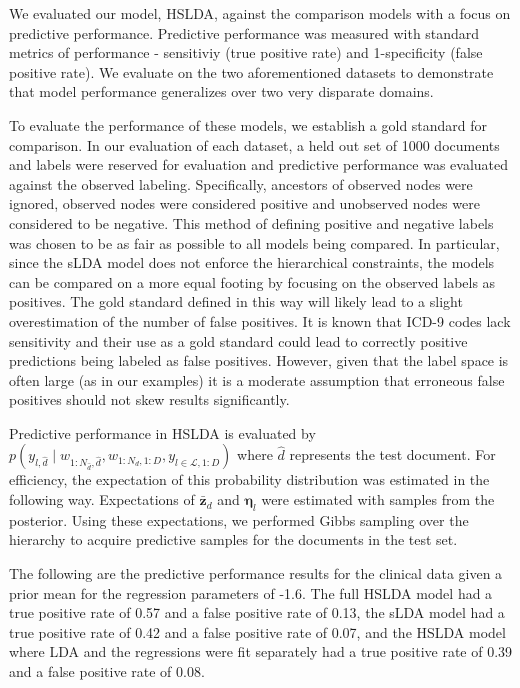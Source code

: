 We evaluated our model, HSLDA, against the comparison models with a focus
on predictive performance. Predictive performance was measured with
standard metrics of performance - sensitiviy (true positive rate) and 
1-specificity (false positive rate). We evaluate on the two aforementioned
datasets to demonstrate that model performance generalizes over two very disparate
domains.

To evaluate the performance of these models, we establish a gold standard for comparison.
In our evaluation of each dataset, a held out set of 1000 documents and labels were
reserved for evaluation and predictive performance was evaluated against the observed
labeling. Specifically, ancestors of observed nodes were ignored, observed nodes 
were considered positive and unobserved nodes were considered to be negative. This method of 
defining positive and negative labels was chosen to be as fair as possible to all models
being compared.  In particular, since the sLDA model does not enforce the hierarchical
constraints, the models can be compared on a more equal footing by focusing on the observed labels
as positives. The gold standard defined in this way will likely lead to a slight overestimation of the number of
false positives. It is known that ICD-9 codes lack sensitivity and their use as a
gold standard could lead to correctly positive predictions being labeled as false positives.
However, given that the label space is often large (as in our examples) it is a moderate assumption that
erroneous false positives should not skew results significantly.

Predictive performance in HSLDA is evaluated by $p\left(y_{l,\hat{d}}\mid w_{1:N_{\hat{d}},\hat{d}}, w_{1:N_d,1:D},  y_{l\in\mathcal{L},1:D}\right)$ where $\hat{d}$ represents the test document. For efficiency,
the expectation of this probability distribution was estimated in the following way. Expectations
of $\mathbf{\bar{z}}_d$ and $\boldsymbol{\eta}_l$ were estimated with samples from the posterior.
Using these expectations, we performed Gibbs sampling over the hierarchy to acquire predictive
samples for the documents in the test set.

The following are the predictive performance results for the clinical
data given a prior mean for the regression parameters of -1.6. 
The full HSLDA model had a true positive rate of 0.57 
and a false positive rate of 0.13, the sLDA model had a true positive
rate of 0.42 and a false positive rate of 0.07, and the HSLDA model where
LDA and the regressions were fit separately had a true positive rate of 0.39
and a false positive rate of 0.08.

